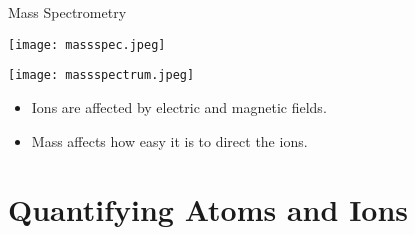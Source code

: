 \documentclass[notes=only]{beamer}
\begin{document}
%

\begin{frame}{Mass Spectrometry}
	\begin{center}
		\texttt{[image: massspec.jpeg]}
	\end{center}

	\begin{minipage}{0.3\linewidth}
		\texttt{[image: massspectrum.jpeg]}
	\end{minipage}
	\hfill
	\begin{minipage}{0.65\linewidth}
		\begin{itemize}
			\item \alert{Ions} are affected by electric and magnetic
				fields.
			\item \alert{Mass} affects how easy it is to direct the
				ions.
		\end{itemize}
	\end{minipage}
\end{frame}


\section{Quantifying Atoms and Ions}
\end{document}
